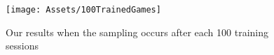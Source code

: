 \begin{figure}[b]
	\centering
	\texttt{[image: Assets/100TrainedGames]}
	\caption{Our results when the sampling occurs after each 100 training sessions}
	\label{fig:pic_png-5}
\end{figure}
